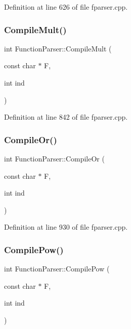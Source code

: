 Definition at line 626 of file fparser.\+cpp.

\mbox{\label{class_function_parser_ade4859b2f9b822a19a2beccbc25d36b0}} 
\subsubsection{\texorpdfstring{Compile\+Mult()}{CompileMult()}}
{\footnotesize\ttfamily int Function\+Parser\+::\+Compile\+Mult (\begin{DoxyParamCaption}\item[{const char $\ast$}]{F,  }\item[{int}]{ind }\end{DoxyParamCaption})\hspace{0.3cm}{\ttfamily [private]}}



Definition at line 842 of file fparser.\+cpp.

\mbox{\label{class_function_parser_a233a126157058829dcda9aa3f00781f8}} 
\subsubsection{\texorpdfstring{Compile\+Or()}{CompileOr()}}
{\footnotesize\ttfamily int Function\+Parser\+::\+Compile\+Or (\begin{DoxyParamCaption}\item[{const char $\ast$}]{F,  }\item[{int}]{ind }\end{DoxyParamCaption})\hspace{0.3cm}{\ttfamily [private]}}



Definition at line 930 of file fparser.\+cpp.

\mbox{\label{class_function_parser_a34d2686ecb9619b0b459bfa249b64498}} 
\subsubsection{\texorpdfstring{Compile\+Pow()}{CompilePow()}}
{\footnotesize\ttfamily int Function\+Parser\+::\+Compile\+Pow (\begin{DoxyParamCaption}\item[{const char $\ast$}]{F,  }\item[{int}]{ind }\end{DoxyParamCaption})\hspace{0.3cm}{\ttfamily [private]}}



